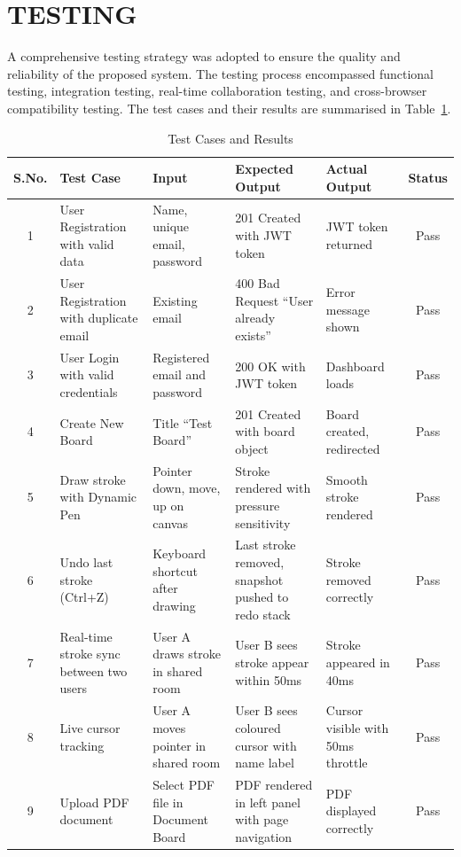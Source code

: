 \documentclass[12pt,a4paper]{report}
\begin{document}
\section{TESTING}

A comprehensive testing strategy was adopted to ensure the quality and reliability of the proposed system. The testing process encompassed functional testing, integration testing, real-time collaboration testing, and cross-browser compatibility testing. The test cases and their results are summarised in Table~\ref{tab:5.2}.

\begin{table}[htbp]
  \caption{Test Cases and Results}
  \label{tab:5.2}
  \centering
  \small
  \begin{tabular}{@{} c p{2.8cm} p{2.5cm} p{2.5cm} p{2.2cm} c @{}}
    \toprule
    \textbf{S.No.} & \textbf{Test Case} & \textbf{Input} & \textbf{Expected Output} & \textbf{Actual Output} & \textbf{Status} \\
    \midrule
    1 & User Registration with valid data & Name, unique email, password & 201 Created with JWT token & JWT token returned & Pass \\
    2 & User Registration with duplicate email & Existing email & 400 Bad Request ``User already exists'' & Error message shown & Pass \\
    3 & User Login with valid credentials & Registered email and password & 200 OK with JWT token & Dashboard loads & Pass \\
    4 & Create New Board & Title ``Test Board'' & 201 Created with board object & Board created, redirected & Pass \\
    5 & Draw stroke with Dynamic Pen & Pointer down, move, up on canvas & Stroke rendered with pressure sensitivity & Smooth stroke rendered & Pass \\
    6 & Undo last stroke (Ctrl+Z) & Keyboard shortcut after drawing & Last stroke removed, snapshot pushed to redo stack & Stroke removed correctly & Pass \\
    7 & Real-time stroke sync between two users & User A draws stroke in shared room & User B sees stroke appear within 50ms & Stroke appeared in 40ms & Pass \\
    8 & Live cursor tracking & User A moves pointer in shared room & User B sees coloured cursor with name label & Cursor visible with 50ms throttle & Pass \\
    9 & Upload PDF document & Select PDF file in Document Board & PDF rendered in left panel with page navigation & PDF displayed correctly & Pass \\

\end{tabular}
\end{table}
\end{document}
